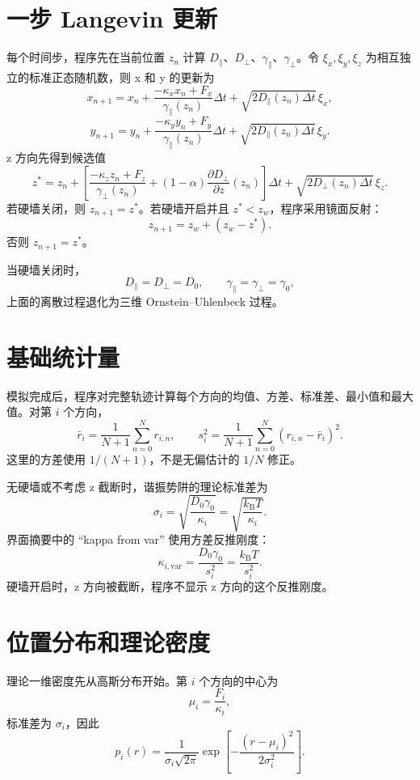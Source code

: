 \documentclass[UTF8,a4paper,12pt,fontset=fandol]{ctexart}
\newcommand{\kb}{k_{\mathrm B}}
\begin{document}
\section{一步 Langevin 更新}

每个时间步，程序先在当前位置 $z_n$ 计算 $D_{\parallel}$、$D_{\perp}$、$\gamma_{\parallel}$、$\gamma_{\perp}$。令 $\xi_x,\xi_y,\xi_z$ 为相互独立的标准正态随机数，则 x 和 y 的更新为
\[
  x_{n+1}
  =x_n+
  \frac{-\kappa_xx_n+F_x}{\gamma_{\parallel}(z_n)}\Delta t
  +\sqrt{2D_{\parallel}(z_n)\Delta t}\,\xi_x,
\]
\[
  y_{n+1}
  =y_n+
  \frac{-\kappa_yy_n+F_y}{\gamma_{\parallel}(z_n)}\Delta t
  +\sqrt{2D_{\parallel}(z_n)\Delta t}\,\xi_y.
\]
z 方向先得到候选值
\[
  z^\ast
  =z_n+
  \left[
  \frac{-\kappa_zz_n+F_z}{\gamma_{\perp}(z_n)}
  +(1-\alpha)\frac{\partial D_{\perp}}{\partial z}(z_n)
  \right]\Delta t
  +\sqrt{2D_{\perp}(z_n)\Delta t}\,\xi_z.
\]
若硬墙关闭，则 $z_{n+1}=z^\ast$。若硬墙开启并且 $z^\ast<z_w$，程序采用镜面反射：
\[
  z_{n+1}=z_w+(z_w-z^\ast).
\]
否则 $z_{n+1}=z^\ast$。

当硬墙关闭时，
\[
  D_{\parallel}=D_{\perp}=D_0,\qquad
  \gamma_{\parallel}=\gamma_{\perp}=\gamma_0,
\]
上面的离散过程退化为三维 Ornstein--Uhlenbeck 过程。

\section{基础统计量}

模拟完成后，程序对完整轨迹计算每个方向的均值、方差、标准差、最小值和最大值。对第 $i$ 个方向，
\[
  \bar r_i=\frac{1}{N+1}\sum_{n=0}^{N} r_{i,n},
  \qquad
  s_i^2=\frac{1}{N+1}\sum_{n=0}^{N}(r_{i,n}-\bar r_i)^2.
\]
这里的方差使用 $1/(N+1)$，不是无偏估计的 $1/N$ 修正。

无硬墙或不考虑 z 截断时，谐振势阱的理论标准差为
\[
  \sigma_i=\sqrt{\frac{D_0\gamma_0}{\kappa_i}}
  =\sqrt{\frac{\kb T}{\kappa_i}}.
\]
界面摘要中的 ``kappa from var'' 使用方差反推刚度：
\[
  \kappa_{i,\mathrm{var}}=\frac{D_0\gamma_0}{s_i^2}
  =\frac{\kb T}{s_i^2}.
\]
硬墙开启时，z 方向被截断，程序不显示 z 方向的这个反推刚度。

\section{位置分布和理论密度}

理论一维密度先从高斯分布开始。第 $i$ 个方向的中心为
\[
  \mu_i=\frac{F_i}{\kappa_i},
\]
标准差为 $\sigma_i$，因此
\[
  p_i(r)=
  \frac{1}{\sigma_i\sqrt{2\pi}}
  \exp\!\left[-\frac{(r-\mu_i)^2}{2\sigma_i^2}\right].
\]
\end{document}
